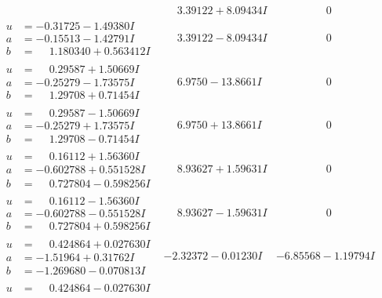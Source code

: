 \documentclass[1p]{elsarticle_modified}
\theoremstyle{definition}
\begin{document}
$$\begin{array}{c|c|c}
 & \phantom{-}3.39122 + 8.09434 I & \phantom{-0.000000 } 0 \\ \hline\begin{aligned}
u &= -0.31725 - 1.49380 I \\
a &= -0.15513 - 1.42791 I \\
b &= \phantom{-}1.180340 + 0.563412 I\end{aligned}
 & \phantom{-}3.39122 - 8.09434 I & \phantom{-0.000000 } 0 \\ \hline\begin{aligned}
u &= \phantom{-}0.29587 + 1.50669 I \\
a &= -0.25279 - 1.73575 I \\
b &= \phantom{-}1.29708 + 0.71454 I\end{aligned}
 & \phantom{-}6.9750 - 13.8661 I & \phantom{-0.000000 } 0 \\ \hline\begin{aligned}
u &= \phantom{-}0.29587 - 1.50669 I \\
a &= -0.25279 + 1.73575 I \\
b &= \phantom{-}1.29708 - 0.71454 I\end{aligned}
 & \phantom{-}6.9750 + 13.8661 I & \phantom{-0.000000 } 0 \\ \hline\begin{aligned}
u &= \phantom{-}0.16112 + 1.56360 I \\
a &= -0.602788 + 0.551528 I \\
b &= \phantom{-}0.727804 - 0.598256 I\end{aligned}
 & \phantom{-}8.93627 + 1.59631 I & \phantom{-0.000000 } 0 \\ \hline\begin{aligned}
u &= \phantom{-}0.16112 - 1.56360 I \\
a &= -0.602788 - 0.551528 I \\
b &= \phantom{-}0.727804 + 0.598256 I\end{aligned}
 & \phantom{-}8.93627 - 1.59631 I & \phantom{-0.000000 } 0 \\ \hline\begin{aligned}
u &= \phantom{-}0.424864 + 0.027630 I \\
a &= -1.51964 + 0.31762 I \\
b &= -1.269680 - 0.070813 I\end{aligned}
 & -2.32372 - 0.01230 I & -6.85568 - 1.19794 I \\ \hline\begin{aligned}
u &= \phantom{-}0.424864 - 0.027630 I \\

\end{aligned}
\end{array}$$
\end{document}
